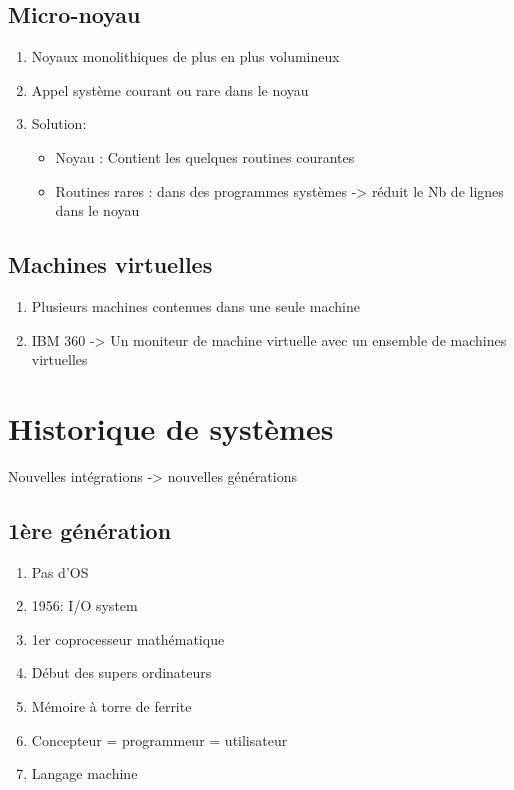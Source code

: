 \subsection{Micro-noyau}
\begin{enumerate}
\item Noyaux monolithiques de plus en plus volumineux
\item Appel système courant ou rare dans le noyau
\item Solution:
\begin{itemize}
\item Noyau : Contient les quelques routines courantes
  \item Routines rares : dans des programmes systèmes -> réduit le Nb de lignes dans le noyau
\end{itemize}
\end{enumerate}

\subsection{Machines virtuelles}
\begin{enumerate}
\item Plusieurs machines contenues dans une seule machine
\item IBM 360 -> Un moniteur de machine virtuelle avec un ensemble de machines virtuelles
\end{enumerate}

\section{Historique de systèmes}
Nouvelles intégrations -> nouvelles générations
\subsection{1ère génération}
\begin{enumerate}
\item Pas d'OS
\item 1956: I/O system
\item 1er coprocesseur mathématique
\item Début des supers ordinateurs
\item Mémoire à torre de ferrite
\item Concepteur = programmeur = utilisateur
\item Langage machine
\end{enumerate}

